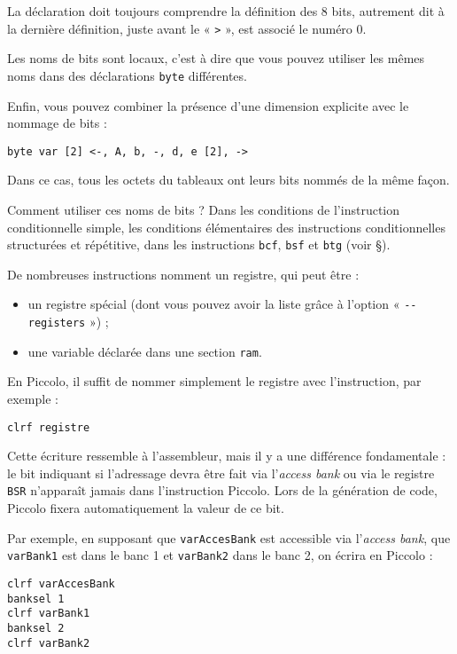 La déclaration doit toujours comprendre la définition des 8 bits, autrement dit à la dernière définition, juste avant le « \texttt{>} », est associé le numéro 0.

Les noms de bits sont locaux, c'est à dire que vous pouvez utiliser les mêmes noms dans des déclarations \texttt{byte} différentes.

Enfin, vous pouvez combiner la présence d'une dimension explicite avec le nommage de bits :

\begin{lstlisting}[language=piccolo]
byte var [2] <-, A, b, -, d, e [2], ->
\end{lstlisting}

Dans ce cas, tous les octets du tableaux ont leurs bits nommés de la même façon.

Comment utiliser ces noms de bits ? Dans les conditions de l'instruction conditionnelle simple, les conditions élémentaires des instructions conditionnelles structurées et répétitive, dans les instructions \texttt{bcf}, \texttt{bsf} et \texttt{btg} (voir §). 



De nombreuses instructions nomment un registre, qui peut être :
\begin{itemize}
  \item un registre spécial (dont vous pouvez avoir la liste grâce à l'option « \texttt{-{}-registers} ») ;
  \item une variable déclarée dans une section \texttt{ram}.
\end{itemize}

En Piccolo, il suffit de nommer simplement le registre avec l'instruction, par exemple :
\begin{lstlisting}[language=piccolo]
clrf registre
\end{lstlisting}

Cette écriture ressemble à l'assembleur, mais il y a une différence fondamentale : le bit indiquant si l'adressage devra être fait via l'\emph{access bank} ou via le registre \texttt{BSR} n'apparaît jamais dans l'instruction Piccolo. Lors de la génération de code, Piccolo fixera automatiquement la valeur de ce bit.

Par exemple, en supposant que \texttt{varAccesBank} est accessible via l'\emph{access bank}, que \texttt{varBank1} est dans le banc 1 et \texttt{varBank2} dans le banc 2, on écrira en Piccolo :

\begin{lstlisting}[language=piccolo]
clrf varAccesBank
banksel 1
clrf varBank1
banksel 2
clrf varBank2
\end{lstlisting}

